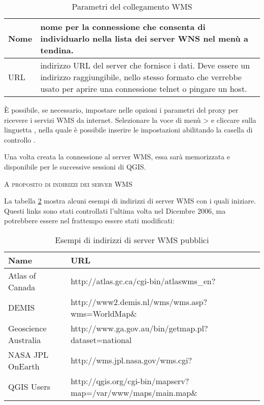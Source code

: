 \begin{table}[ht]
\centering
\caption{Parametri del collegamento WMS}\label{tab:wms_connection_parms}\medskip
 \begin{tabular}{|l|p{5in}|}
\hline Nome & nome per la connessione che consenta di individuarlo nella
lista dei server WNS nel menù a tendina. \\
\hline URL \index{WMS!URL} &  indirizzo URL del server che fornisce i dati.
Deve essere un indirizzo raggiungibile, nello stesso formato che verrebbe
usato per aprire una connessione telnet o pingare un host. \\
\hline
\end{tabular}
\end{table}

È possibile, se necessario, impostare nelle opzioni i parametri del proxy per ricevere i servizi WMS da internet.
Selezionare la voce di menù  >
 e cliccare sulla linguetta
, nella quale è possibile inserire le impostazioni abilitando la
casella di controllo .

Una volta creata la connessione al server WMS, essa sarà memorizzata e
disponibile per le successive sessioni di QGIS.

\begin{Tip}[ht]\caption{\textsc{A proposito di indirizzi dei server WMS}}
\end{Tip}

La tabella \ref{tab:wms_example_urls} mostra alcuni esempi di indirizzi di
server WMS con i quali iniziare.
Questi links sono stati controllati l'ultima volta nel Dicembre 2006, ma
potrebbere essere nel frattempo essere stati modificati:


\begin{table}[ht]
\centering
\caption{Esempi di indirizzi di server WMS pubblici}\label{tab:wms_example_urls}\medskip
 \begin{tabular}{|l|l|}
\hline \textbf{Name}        & \textbf{URL} \\
\hline Atlas of Canada      & http://atlas.gc.ca/cgi-bin/atlaswms\_en? \\
\hline DEMIS                & http://www2.demis.nl/wms/wms.asp?wms=WorldMap\& \\
\hline Geoscience Australia & http://www.ga.gov.au/bin/getmap.pl?dataset=national \\
\hline NASA JPL OnEarth     & http://wms.jpl.nasa.gov/wms.cgi? \\
\hline QGIS Users           & http://qgis.org/cgi-bin/mapserv?map=/var/www/maps/main.map\& \\
\hline
\end{tabular}
\end{table}

